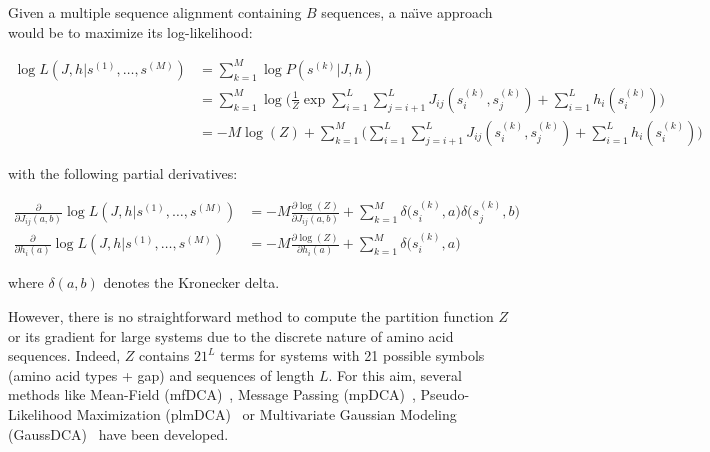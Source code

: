         Given a multiple sequence alignment containing $B$ sequences, a na\"\i ve approach would be to maximize its log-likelihood:  %

        \begin{equation}
            \begin{split}
                \log{L}(J, h \vert s^{(1)}, \dotsc, s^{(M)}) & = \sum\limits_{k=1}^M \log P(s^{(k)} \vert J, h) \\
                & = \sum\limits_{k=1}^M \log \Bigg( \frac{1}{Z} \exp{\sum\limits_{i=1}^L
                    \sum\limits_{j=i+1}^L J_{ij}(s_i^{(k)}, s_j^{(k)}) + \sum\limits_{i=1}^L h_i(s_i^{(k)})} \Bigg) \\
                & = -M \log(Z) + \sum\limits_{k=1}^M \Big( \sum\limits_{i=1}^L \sum\limits_{j=i+1}^L J_{ij}(s_i^{(k)}, s_j^{(k)})
                    + \sum\limits_{i=1}^L h_i(s_i^{(k)}) \Big)
            \end{split}
        \end{equation}

        with the following partial derivatives:

        \begin{equation}
            \begin{split}
                \frac{\partial}{\partial J_{ij}(a, b)} \log{L}(J, h \vert s^{(1)}, \dotsc, s^{(M)}) & =
                    -M \frac{\partial \log(Z)}{\partial J_{ij}(a, b)} + \sum\limits_{k=1}^M \delta\Big(s_i^{(k)}, a\Big) \delta\Big(s_j^{(k)}, b\Big) \\
                 \frac{\partial}{\partial h_{i}(a)} \log{L}(J, h \vert s^{(1)}, \dotsc, s^{(M)}) & =
                    -M \frac{\partial \log(Z)}{\partial h_{i}(a)} + \sum\limits_{k=1}^M \delta\Big(s_i^{(k)}, a\Big)
            \end{split}
        \end{equation}

        where $\delta(a, b)$ denotes the Kronecker delta.  %

        However, there is no straightforward method to compute the partition function $Z$ or its gradient for large  %
        systems due to the discrete nature of amino acid sequences. Indeed, $Z$ contains $21^L$ terms for systems with 21 possible symbols (amino acid types + gap)
        and sequences of length $L$. For this aim, several methods like Mean-Field (mfDCA)~\cite{MorcosE1293}, Message Passing (mpDCA)~\cite{Weigt2009},
        Pseudo-Likelihood Maximization (plmDCA)~\cite{EKEBERG2014341} or Multivariate Gaussian Modeling (GaussDCA)~\cite{10.1371/journal.pone.0092721}
        have been developed.

